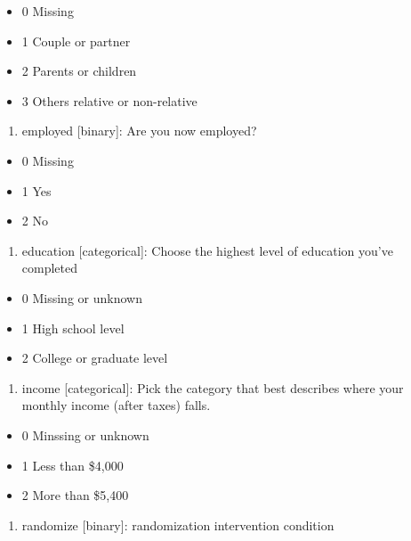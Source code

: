 \documentclass[
  letterpaper,
  DIV=11,
  numbers=noendperiod]{scrreprt}
\providecommand{\tightlist}{%
  \setlength{\itemsep}{0pt}\setlength{\parskip}{0pt}}\usepackage{longtable,booktabs,array}
\begin{document}
\begin{itemize}
\tightlist
\item
  0 Missing
\item
  1 Couple or partner
\item
  2 Parents or children
\item
  3 Others relative or non-relative
\end{itemize}

\begin{enumerate}
\def\labelenumi{\arabic{enumi}.}
\setcounter{enumi}{13}
\tightlist
\item
  employed {[}binary{]}: Are you now employed?
\end{enumerate}

\begin{itemize}
\tightlist
\item
  0 Missing
\item
  1 Yes
\item
  2 No
\end{itemize}

\begin{enumerate}
\def\labelenumi{\arabic{enumi}.}
\setcounter{enumi}{14}
\tightlist
\item
  education {[}categorical{]}: Choose the highest level of education
  you've completed
\end{enumerate}

\begin{itemize}
\tightlist
\item
  0 Missing or unknown
\item
  1 High school level
\item
  2 College or graduate level
\end{itemize}

\begin{enumerate}
\def\labelenumi{\arabic{enumi}.}
\setcounter{enumi}{15}
\tightlist
\item
  income {[}categorical{]}: Pick the category that best describes where
  your monthly income (after taxes) falls.
\end{enumerate}

\begin{itemize}
\tightlist
\item
  0 Minssing or unknown
\item
  1 Less than \$4,000
\item
  2 More than \$5,400
\end{itemize}

\begin{enumerate}
\def\labelenumi{\arabic{enumi}.}
\setcounter{enumi}{16}
\tightlist
\item
  randomize {[}binary{]}: randomization intervention condition
\end{enumerate}
\end{document}
